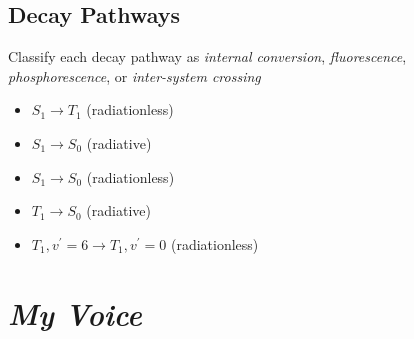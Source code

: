 \documentclass[11pt, letterpaper]{memoir}
\begin{document}
{\newpage
\subsection*{Decay Pathways}
Classify each decay pathway as \emph{internal conversion}, \emph{fluorescence}, \emph{phosphorescence}, or \emph{inter-system crossing}

\begin{itemize}
	\item $S_1 \rightarrow T_1$ (radiationless)

	      \vspace{1em}
	\item $S_1 \rightarrow S_0$ (radiative)

	      \vspace{1em}
	\item $S_1 \rightarrow S_0$ (radiationless)

	      \vspace{1em}
	\item $T_1 \rightarrow S_0$ (radiative)

	      \vspace{1em}
	\item $T_1,v^\prime=6 \rightarrow T_1,v^\prime=0$ (radiationless)
\end{itemize}

\newpage
\pagestyle{empty}
\addtocounter{page}{-1}
\section*{\emph{My Voice}}
}
\end{document}

